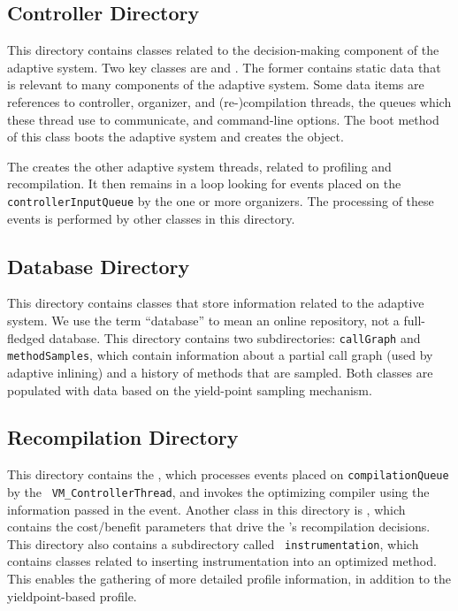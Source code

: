 \subsection{Controller Directory}
This directory contains classes related to 
the decision-making component of the adaptive system.
Two key classes are 
 and 
.  
The former contains static data that
is relevant to many components of the adaptive system.  Some data
items are references to controller, organizer, and
(re-)compilation threads, the queues which these thread use to 
communicate, and command-line options.  The boot method of this class
boots the adaptive system and creates the  
object. 

The  creates
the other adaptive system 
threads, related to profiling and recompilation.  It then remains in a
loop looking for events placed on the {\tt controllerInputQueue} by
the one or more organizers.  The processing of these events is
performed by other classes in this directory.

\subsection{Database Directory}
This directory contains classes that store information related to the
adaptive system.  We use the term ``database'' to mean an online
repository, not a full-fledged database. This directory contains two
subdirectories: 
{\tt callGraph} and {\tt methodSamples}, which contain information
about a partial call graph (used by adaptive inlining) and a history
of methods that are sampled.  Both classes are populated with data based
on the yield-point sampling mechanism.

\subsection{Recompilation Directory}
This directory contains the , which 
processes
events placed on {\tt compilationQueue} by the {\tt
VM\_Con\-trol\-lerThread}, and invokes the optimizing compiler using the
information passed in the event.  Another class in this directory is
, which contains the cost/benefit
parameters that drive the 's recompilation 
decisions. This directory also contains a subdirectory called {\tt
instrumentation}, which contains classes related to inserting
instrumentation into an optimized method.  This enables the gathering
of more detailed profile information, in addition to the
yieldpoint-based profile.

